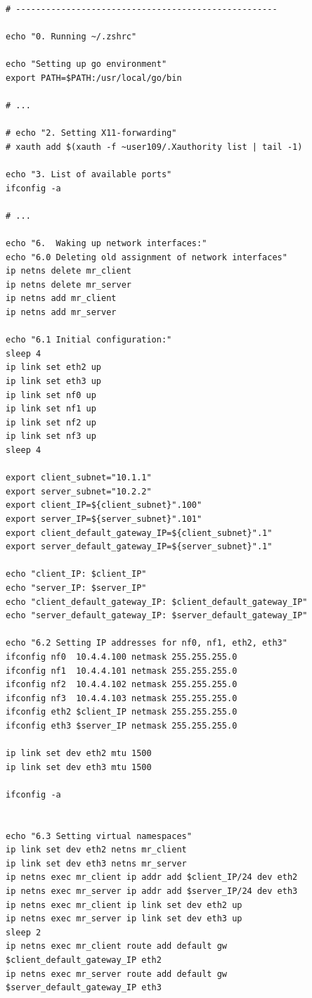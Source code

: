 \documentclass[12pt,a4paper]{report}
\begin{document}
\begin{verbatim}
# ----------------------------------------------------

echo "0. Running ~/.zshrc"

echo "Setting up go environment"
export PATH=$PATH:/usr/local/go/bin

# ...

# echo "2. Setting X11-forwarding"
# xauth add $(xauth -f ~user109/.Xauthority list | tail -1)

echo "3. List of available ports"
ifconfig -a

# ...

echo "6.  Waking up network interfaces:"
echo "6.0 Deleting old assignment of network interfaces"
ip netns delete mr_client
ip netns delete mr_server
ip netns add mr_client
ip netns add mr_server

echo "6.1 Initial configuration:"
sleep 4
ip link set eth2 up
ip link set eth3 up
ip link set nf0 up
ip link set nf1 up
ip link set nf2 up
ip link set nf3 up
sleep 4

export client_subnet="10.1.1"
export server_subnet="10.2.2"
export client_IP=${client_subnet}".100"
export server_IP=${server_subnet}".101"
export client_default_gateway_IP=${client_subnet}".1"
export server_default_gateway_IP=${server_subnet}".1"

echo "client_IP: $client_IP"
echo "server_IP: $server_IP"
echo "client_default_gateway_IP: $client_default_gateway_IP"
echo "server_default_gateway_IP: $server_default_gateway_IP"

echo "6.2 Setting IP addresses for nf0, nf1, eth2, eth3"
ifconfig nf0  10.4.4.100 netmask 255.255.255.0
ifconfig nf1  10.4.4.101 netmask 255.255.255.0
ifconfig nf2  10.4.4.102 netmask 255.255.255.0
ifconfig nf3  10.4.4.103 netmask 255.255.255.0
ifconfig eth2 $client_IP netmask 255.255.255.0
ifconfig eth3 $server_IP netmask 255.255.255.0

ip link set dev eth2 mtu 1500
ip link set dev eth3 mtu 1500

ifconfig -a


echo "6.3 Setting virtual namespaces"
ip link set dev eth2 netns mr_client
ip link set dev eth3 netns mr_server
ip netns exec mr_client ip addr add $client_IP/24 dev eth2
ip netns exec mr_server ip addr add $server_IP/24 dev eth3
ip netns exec mr_client ip link set dev eth2 up
ip netns exec mr_server ip link set dev eth3 up
sleep 2
ip netns exec mr_client route add default gw $client_default_gateway_IP eth2
ip netns exec mr_server route add default gw $server_default_gateway_IP eth3


\end{verbatim}
\end{document}
